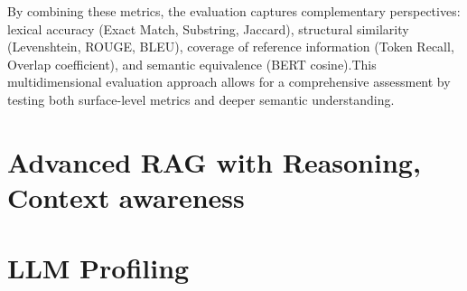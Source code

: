 By combining these metrics, the evaluation captures complementary perspectives:  
lexical accuracy (Exact Match, Substring, Jaccard), structural similarity (Levenshtein, ROUGE, BLEU), coverage of reference information (Token Recall, Overlap coefficient), and semantic equivalence (BERT cosine).This multidimensional evaluation approach allows for a comprehensive assessment by testing both surface-level metrics and deeper semantic understanding.

\section{Advanced RAG with Reasoning, Context awareness}

\section{LLM Profiling}